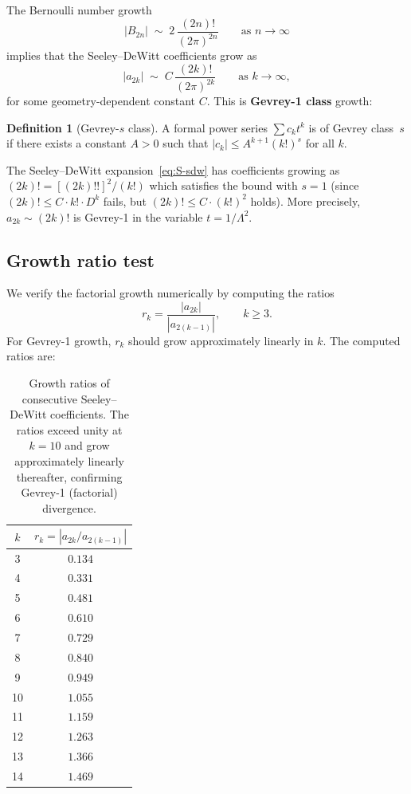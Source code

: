 \documentclass[11pt,a4paper]{article}
\newcommand{\Lam}{\Lambda}
\theoremstyle{plain}
\theoremstyle{definition}
\newtheorem{definition}[theorem]{Definition}
\begin{document}
The Bernoulli number growth~\cite{A00,BGV04}
\begin{equation}\label{eq:bernoulli-growth}
  |B_{2n}| \;\sim\; 2\,\frac{(2n)!}{(2\pi)^{2n}}
  \qquad \text{as } n \to \infty
\end{equation}
implies that the Seeley--DeWitt coefficients grow as
\begin{equation}\label{eq:sdw-growth}
  |a_{2k}| \;\sim\; C\,\frac{(2k)!}{(2\pi)^{2k}}
  \qquad \text{as } k \to \infty,
\end{equation}
for some geometry-dependent constant $C$.  This is \textbf{Gevrey-1 class} growth:
\begin{definition}[Gevrey-$s$ class]\label{def:gevrey}
A formal power series $\sum c_k t^k$ is of Gevrey class~$s$ if there exists
a constant $A > 0$ such that $|c_k| \leq A^{k+1}(k!)^s$ for all $k$.
\end{definition}

The Seeley--DeWitt expansion~\eqref{eq:S-sdw} has coefficients growing as
$(2k)! = [(2k)!!]^2/(k!)$ which satisfies the bound with $s = 1$ (since
$(2k)! \leq C \cdot k! \cdot D^k$ fails, but $(2k)! \leq C \cdot (k!)^2$ holds).
More precisely, $a_{2k} \sim (2k)!$ is Gevrey-1 in the variable $t = 1/\Lam^2$.

\subsection{Growth ratio test}

We verify the factorial growth numerically by computing the ratios
\begin{equation}\label{eq:growth-ratio}
  r_k = \frac{|a_{2k}|}{|a_{2(k-1)}|}, \qquad k \geq 3.
\end{equation}
For Gevrey-1 growth, $r_k$ should grow approximately linearly in $k$.
The computed ratios are:

\begin{table}[h]
\centering
\begin{tabular}{cc}
\toprule
$k$ & $r_k = |a_{2k}/a_{2(k-1)}|$ \\
\midrule
3 & $0.134$ \\
4 & $0.331$ \\
5 & $0.481$ \\
6 & $0.610$ \\
7 & $0.729$ \\
8 & $0.840$ \\
9 & $0.949$ \\
10 & $1.055$ \\
11 & $1.159$ \\
12 & $1.263$ \\
13 & $1.366$ \\
14 & $1.469$ \\
\bottomrule
\end{tabular}
\caption{Growth ratios of consecutive Seeley--DeWitt coefficients.
The ratios exceed unity at $k = 10$ and grow approximately linearly
thereafter, confirming Gevrey-1 (factorial) divergence.}
\label{tab:growth-ratios}
\end{table}
\end{document}

